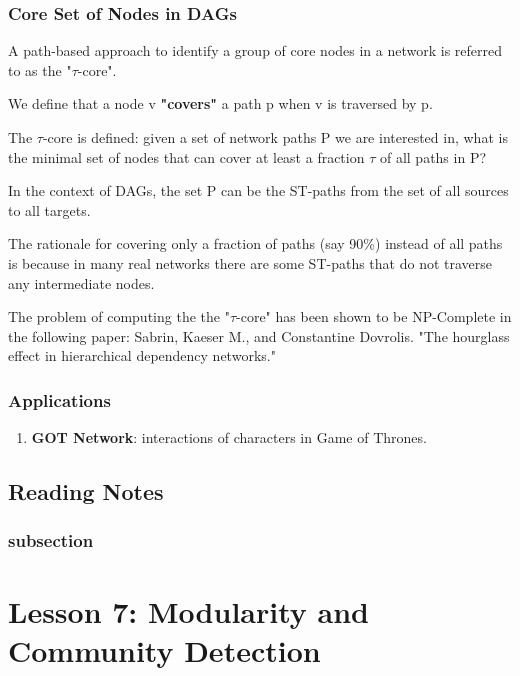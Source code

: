 \documentclass[11pt]{scrartcl} %
\begin{document}
\subsubsection{Core Set of Nodes in DAGs}
A path-based approach to identify a group of core nodes in a network is referred to as the "$\tau$-core".

We define that a node v \textbf{"covers"} a path p when v is traversed by p. 

The $\tau$-core is defined: given a set of network paths P we are interested in, what is the minimal set of nodes that can cover at least a fraction $\tau$ of all paths in P?

In the context of DAGs, the set P can be the ST-paths from the set of all sources to all targets.

The rationale for covering only a fraction  of paths (say 90\%) instead of all paths is because in many real networks there are some ST-paths that do not traverse any intermediate nodes.

The problem of computing the the "$\tau$-core" has been shown to be NP-Complete in the following paper: Sabrin, Kaeser M., and Constantine Dovrolis. "The hourglass effect in hierarchical dependency networks."

\subsubsection{Applications}
\begin{enumerate}
	\item \textbf{GOT Network}: interactions of characters in Game of Thrones.
\end{enumerate}

\subsection{Reading Notes}

\subsubsection{subsection}
\textbf{}



\section{Lesson 7: Modularity and Community Detection}
\end{document}
